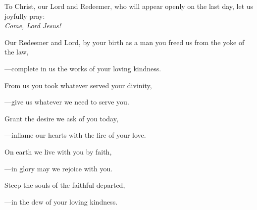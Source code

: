 \intercessions\indent

\begin{hangpar}

To Christ, our Lord and Redeemer, who will appear openly on the last day, let us joyfully pray:\\
\emph{ Come, Lord Jesus!}

\medskip Our Redeemer and Lord, by your birth as a man you freed us from the yoke of the law,

{\color{red}---\thinspace}complete in us the works of your loving kindness.

\medskip From us you took whatever served your divinity,

{\color{red}---\thinspace}give us whatever we need to serve you.

\medskip Grant the desire we ask of you today,

{\color{red}---\thinspace}inflame our hearts with the fire of your love.

\medskip On earth we live with you by faith,

{\color{red}---\thinspace}in glory may we rejoice with you.

\medskip Steep the souls of the faithful departed,

{\color{red}---\thinspace}in the dew of your loving kindness.

\medskip

\end{hangpar}